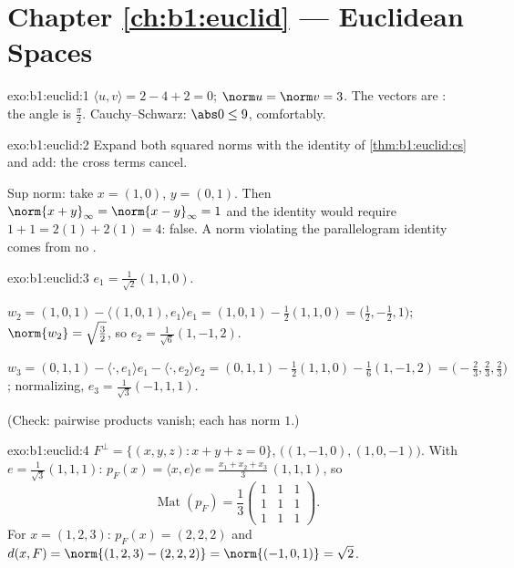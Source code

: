 \section*{Chapter \ref{ch:b1:euclid} --- Euclidean Spaces}

\begin{solution}{exo:b1:euclid:1}
$\langle u, v\rangle = 2 - 4 + 2 = 0$; $\norm u = \norm v = 3$. The
vectors are : the angle is $\frac\pi2$. Cauchy--Schwarz:
$\abs 0 \leq 9$, comfortably.
\end{solution}

\begin{solution}{exo:b1:euclid:2}
Expand both squared norms with the identity of
\cref{thm:b1:euclid:cs} and add: the cross terms cancel.

Sup norm: take $x = (1, 0)$, $y = (0, 1)$. Then $\norm{x + y}_\infty
= \norm{x - y}_\infty = 1$ and the identity would require $1 + 1 =
2(1) + 2(1) = 4$: false. A norm violating the parallelogram
identity comes from no .
\end{solution}

\begin{solution}{exo:b1:euclid:3}
$e_1 = \frac{1}{\sqrt 2}(1,1,0)$.

$w_2 = (1,0,1) - \langle (1,0,1), e_1\rangle e_1 = (1,0,1) -
\frac{1}{2}(1,1,0) = \bigl(\tfrac12, -\tfrac12, 1\bigr)$;
$\norm{w_2} = \sqrt{\tfrac32}$, so $e_2 =
\frac{1}{\sqrt 6}(1, -1, 2)$.

$w_3 = (0,1,1) - \langle\cdot, e_1\rangle e_1 - \langle\cdot,
e_2\rangle e_2 = (0,1,1) - \frac12 (1,1,0) - \frac16(1,-1,2) =
\bigl(-\tfrac23, \tfrac23, \tfrac23\bigr)$; normalizing, $e_3 =
\frac{1}{\sqrt 3}(-1, 1, 1)$.

(Check: pairwise products vanish; each has norm $1$.)
\end{solution}

\begin{solution}{exo:b1:euclid:4}
$F^\perp = \{(x,y,z) : x + y + z = 0\}$,  $\bigl((1,-1,0),
(1,0,-1)\bigr)$. With $e = \frac{1}{\sqrt3}(1,1,1)$: $p_F(x) =
\langle x, e\rangle e = \frac{x_1 + x_2 + x_3}{3}\,(1,1,1)$, so
\[
\operatorname{Mat}(p_F) = \frac13
\begin{pmatrix} 1&1&1\\ 1&1&1\\ 1&1&1\end{pmatrix}.
\]
For $x = (1,2,3)$: $p_F(x) = (2,2,2)$ and $d(x, F) = \norm{(1,2,3)
- (2,2,2)} = \norm{(-1,0,1)} = \sqrt 2$.
\end{solution}

